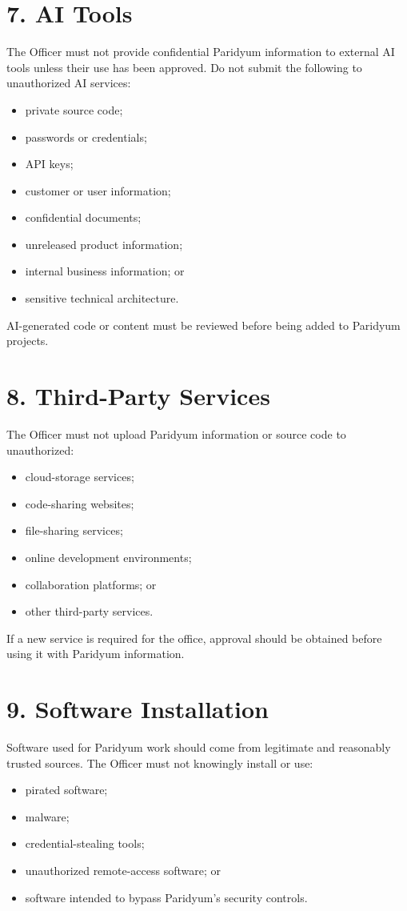 \documentclass{paridyum}
\begin{document}
\section*{7. AI Tools}
The Officer must not provide confidential Paridyum information to external AI tools
unless their use has been approved. Do not submit the following to unauthorized AI
services:
\begin{itemize}[leftmargin=*, noitemsep]
    \item private source code;
    \item passwords or credentials;
    \item API keys;
    \item customer or user information;
    \item confidential documents;
    \item unreleased product information;
    \item internal business information; or
    \item sensitive technical architecture.
\end{itemize}
AI-generated code or content must be reviewed before being added to Paridyum projects.

\section*{8. Third-Party Services}
The Officer must not upload Paridyum information or source code to unauthorized:
\begin{itemize}[leftmargin=*, noitemsep]
    \item cloud-storage services;
    \item code-sharing websites;
    \item file-sharing services;
    \item online development environments;
    \item collaboration platforms; or
    \item other third-party services.
\end{itemize}
If a new service is required for the office, approval should be obtained before
using it with Paridyum information.

\section*{9. Software Installation}
Software used for Paridyum work should come from legitimate and reasonably trusted
sources. The Officer must not knowingly install or use:
\begin{itemize}[leftmargin=*, noitemsep]
    \item pirated software;
    \item malware;
    \item credential-stealing tools;
    \item unauthorized remote-access software; or
    \item software intended to bypass Paridyum's security controls.
\end{itemize}
\end{document}
